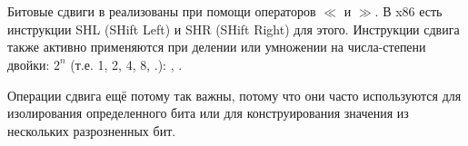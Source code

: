 \section{\ShiftsSectionName}

Битовые сдвиги в \CCpp реализованы при помощи операторов $\ll$ и $\gg$.
В x86 есть инструкции SHL (SHift Left) и SHR (SHift Right) для этого.
Инструкции сдвига также активно применяются при делении или умножении на числа-степени двойки: $2^{n}$ (т.е. 1, 2, 4, 8, \etc{}.):
,
.


Операции сдвига ещё потому так важны, потому что они часто используются для изолирования
определенного бита или для конструирования значения из нескольких разрозненных бит.

